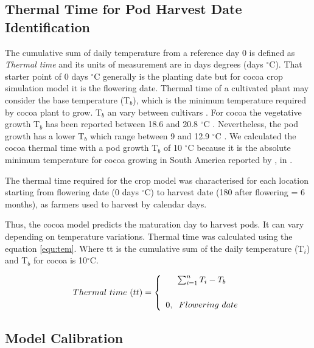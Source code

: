 \documentclass[gene,journal,article,submit,moreauthors,pdftex]{Definitions/mdpi}
\begin{document}
\subsection{Thermal Time for Pod Harvest Date Identification}

{\color{olive} The cumulative sum of daily temperature from a reference day 0 is defined as \emph{Thermal time} and  its units of measurement are in days degrees (days $^\circ$C). That starter point of 0 days $^\circ$C generally is the planting date \citep{Ritchie1991} but for cocoa crop simulation model it is the flowering date.  Thermal time of a cultivated plant may consider the base temperature (T$_{b}$), which is the minimum temperature required by cocoa plant to grow. T$_{b}$ an vary between cultivars \citep{Slafer1995, Daymond2008}. For cocoa the vegetative growth T$_{b}$ has been reported between 18.6 and 20.8 $^\circ$C \citep{Daymond2008}. Nevertheless, the pod growth  has a lower T$_{b}$ which range between 9 and 12.9 $^\circ$C \citep{Daymond2008, lahive2019}. We calculated the cocoa thermal time with a pod growth T$_{b}$ of 10 $^\circ$C because it is the absolute minimum temperature for cocoa growing in South America reported by \cite{Erneholm1948}, in \citep{lahive2019}.    
 
The thermal time required for the crop model was characterised for each location starting from flowering date (0 days $^\circ$C) to harvest date (180 after flowering = 6 months), as farmers used to harvest by calendar days. }  Thus, the cocoa model predicts the maturation day to harvest pods. It can vary depending on temperature variations.  Thermal time was calculated using the equation \ref{equ:tem}. Where tt is the cumulative sum of the daily temperature (T$_{i}$) and T$_{b}$ for cocoa is 10$^\circ$C.

\begin{equation}
Thermal~time~(tt) = \left\lbrace\begin{array}{c} \sum_{i=1}^{n} T_{i} - T_{b} \\
\vspace{0.2cm}\\ 
0,\hspace{0.2cm} Flowering~date\end{array}\right.
\label{equ:tem}
\end{equation}


\subsection{Model Calibration}
\end{document}
